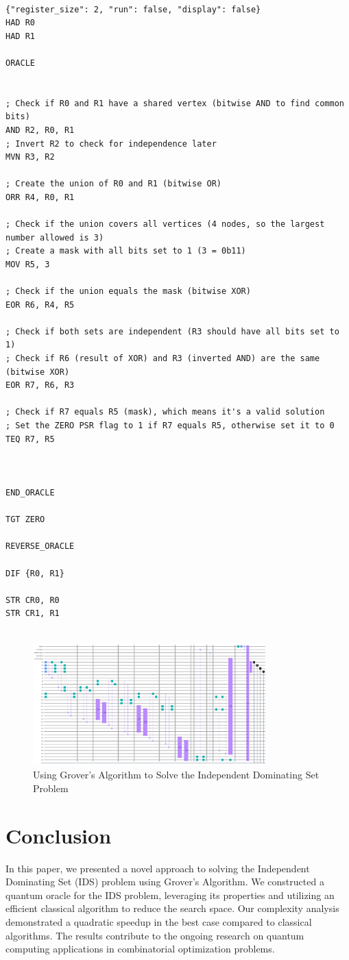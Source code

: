 \begin{lstlisting}

{"register_size": 2, "run": false, "display": false}
HAD R0
HAD R1

ORACLE


; Check if R0 and R1 have a shared vertex (bitwise AND to find common bits)
AND R2, R0, R1
; Invert R2 to check for independence later
MVN R3, R2

; Create the union of R0 and R1 (bitwise OR)
ORR R4, R0, R1

; Check if the union covers all vertices (4 nodes, so the largest number allowed is 3)
; Create a mask with all bits set to 1 (3 = 0b11)
MOV R5, 3

; Check if the union equals the mask (bitwise XOR)
EOR R6, R4, R5

; Check if both sets are independent (R3 should have all bits set to 1)
; Check if R6 (result of XOR) and R3 (inverted AND) are the same (bitwise XOR)
EOR R7, R6, R3

; Check if R7 equals R5 (mask), which means it's a valid solution
; Set the ZERO PSR flag to 1 if R7 equals R5, otherwise set it to 0
TEQ R7, R5



END_ORACLE

TGT ZERO

REVERSE_ORACLE

DIF {R0, R1}

STR CR0, R0
STR CR1, R1


\end{lstlisting}

\begin{figure}[htp]
    \centering
    \includegraphics[width=9cm]{Figures/Independent_Dominating_Set_circuit.png}
    \caption{Using Grover's Algorithm to Solve the Independent Dominating Set Problem}
    \label{fig:Independent_Dominating_Set}
\end{figure}

\section{Conclusion}
\label{sec:conclusion}
In this paper, we presented a novel approach to solving the Independent Dominating Set (IDS) problem using Grover's Algorithm. We constructed a quantum oracle for the IDS problem, leveraging its properties and utilizing an efficient classical algorithm to reduce the search space. Our complexity analysis demonstrated a quadratic speedup in the best case compared to classical algorithms. The results contribute to the ongoing research on quantum computing applications in combinatorial optimization problems.


